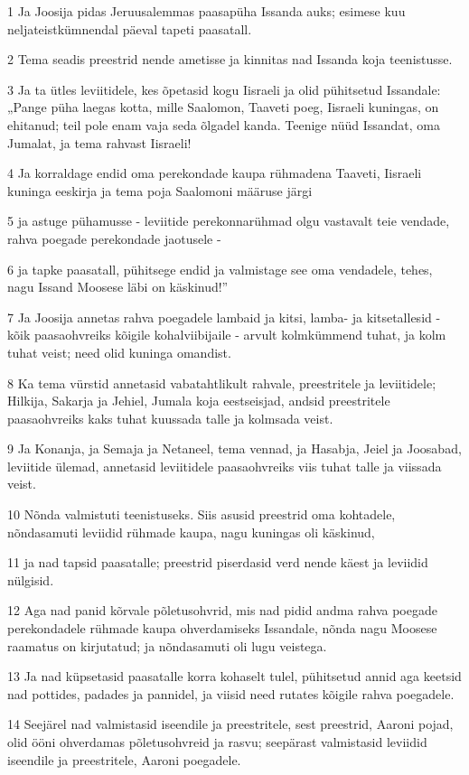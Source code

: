 \par 1 Ja Joosija pidas Jeruusalemmas paasapüha Issanda auks; esimese kuu neljateistkümnendal päeval tapeti paasatall.
\par 2 Tema seadis preestrid nende ametisse ja kinnitas nad Issanda koja teenistusse.
\par 3 Ja ta ütles leviitidele, kes õpetasid kogu Iisraeli ja olid pühitsetud Issandale: „Pange püha laegas kotta, mille Saalomon, Taaveti poeg, Iisraeli kuningas, on ehitanud; teil pole enam vaja seda õlgadel kanda. Teenige nüüd Issandat, oma Jumalat, ja tema rahvast Iisraeli!
\par 4 Ja korraldage endid oma perekondade kaupa rühmadena Taaveti, Iisraeli kuninga eeskirja ja tema poja Saalomoni määruse järgi
\par 5 ja astuge pühamusse - leviitide perekonnarühmad olgu vastavalt teie vendade, rahva poegade perekondade jaotusele -
\par 6 ja tapke paasatall, pühitsege endid ja valmistage see oma vendadele, tehes, nagu Issand Moosese läbi on käskinud!”
\par 7 Ja Joosija annetas rahva poegadele lambaid ja kitsi, lamba- ja kitsetallesid - kõik paasaohvreiks kõigile kohalviibijaile - arvult kolmkümmend tuhat, ja kolm tuhat veist; need olid kuninga omandist.
\par 8 Ka tema vürstid annetasid vabatahtlikult rahvale, preestritele ja leviitidele; Hilkija, Sakarja ja Jehiel, Jumala koja eestseisjad, andsid preestritele paasaohvreiks kaks tuhat kuussada talle ja kolmsada veist.
\par 9 Ja Konanja, ja Semaja ja Netaneel, tema vennad, ja Hasabja, Jeiel ja Joosabad, leviitide ülemad, annetasid leviitidele paasaohvreiks viis tuhat talle ja viissada veist.
\par 10 Nõnda valmistuti teenistuseks. Siis asusid preestrid oma kohtadele, nõndasamuti leviidid rühmade kaupa, nagu kuningas oli käskinud,
\par 11 ja nad tapsid paasatalle; preestrid piserdasid verd nende käest ja leviidid nülgisid.
\par 12 Aga nad panid kõrvale põletusohvrid, mis nad pidid andma rahva poegade perekondadele rühmade kaupa ohverdamiseks Issandale, nõnda nagu Moosese raamatus on kirjutatud; ja nõndasamuti oli lugu veistega.
\par 13 Ja nad küpsetasid paasatalle korra kohaselt tulel, pühitsetud annid aga keetsid nad pottides, padades ja pannidel, ja viisid need rutates kõigile rahva poegadele.
\par 14 Seejärel nad valmistasid iseendile ja preestritele, sest preestrid, Aaroni pojad, olid ööni ohverdamas põletusohvreid ja rasvu; seepärast valmistasid leviidid iseendile ja preestritele, Aaroni poegadele.
